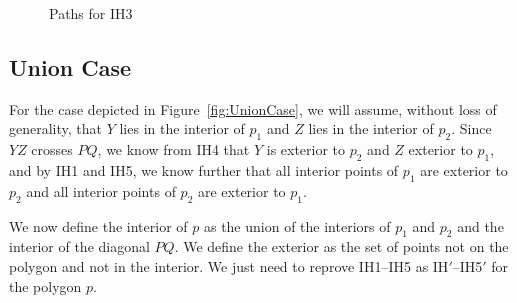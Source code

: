 \begin{figure}
\centering
{}
\caption{Paths for IH3}
\end{figure}

\subsection{Union Case}
For the case depicted in Figure~\ref{fig:UnionCase}, we will assume, without loss of generality, that $Y$ lies in the interior of $p_1$ and $Z$ lies in the interior of $p_2$. Since $YZ$ crosses $PQ$, we know from IH4 that $Y$ is exterior to $p_2$ and $Z$ exterior to $p_1$, and by IH1 and IH5, we know further that all interior points of $p_1$ are exterior to $p_2$ and all interior points of $p_2$ are exterior to $p_1$.

We now define the interior of $p$ as the union of the interiors of $p_1$ and $p_2$ and the interior of the diagonal $PQ$. We define the exterior as the set of points not on the polygon and not in the interior. We just need to reprove IH1--IH5 as IH$'$--IH5$'$ for the polygon $p$.

